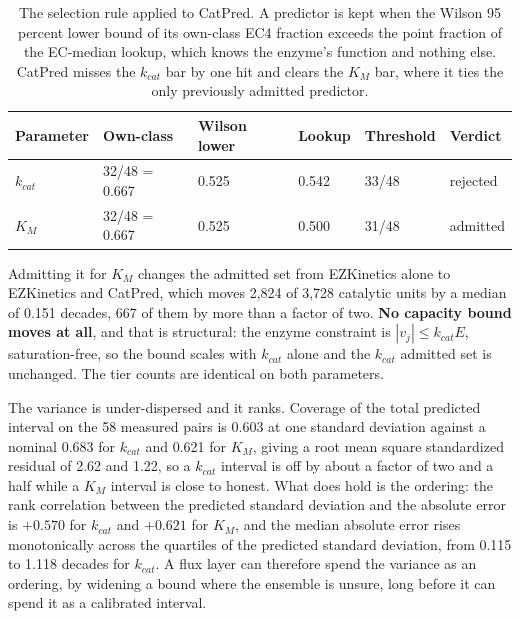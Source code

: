 \begin{table}[!htbp]
  \centering
  \footnotesize
  \caption[CatPred admission]{The selection rule applied to CatPred. A predictor is kept
  when the Wilson 95 percent lower bound of its own-class EC4 fraction exceeds the point
  fraction of the EC-median lookup, which knows the enzyme's function and nothing else.
  CatPred misses the $k_{cat}$ bar by one hit and clears the $K_M$ bar, where it ties the
  only previously admitted predictor.}
  \label{tab:catpred-admission}
  \begin{tabular}{llllll}
    \hline
    Parameter & Own-class & Wilson lower & Lookup & Threshold & Verdict \\
    \hline
    $k_{cat}$ & 32/48 = 0.667 & 0.525 & 0.542 & 33/48 & rejected \\
    $K_M$ & 32/48 = 0.667 & 0.525 & 0.500 & 31/48 & admitted \\
    \hline
  \end{tabular}
\end{table}

Admitting it for $K_M$ changes the admitted set from EZKinetics alone to EZKinetics and
CatPred, which moves 2{,}824 of 3{,}728 catalytic units by a median of 0.151 decades, 667 of
them by more than a factor of two. \textbf{No capacity bound moves at all}, and that is
structural: the enzyme constraint is $|v_j| \le k_{cat} E$, saturation-free, so the bound
scales with $k_{cat}$ alone and the $k_{cat}$ admitted set is unchanged. The tier counts are
identical on both parameters.

The variance is under-dispersed and it ranks. Coverage of the total predicted interval on
the 58 measured pairs is 0.603 at one standard deviation against a nominal 0.683 for
$k_{cat}$ and 0.621 for $K_M$, giving a root mean square standardized residual of 2.62 and
1.22, so a $k_{cat}$ interval is off by about a factor of two and a half while a $K_M$
interval is close to honest. What does hold is the ordering: the rank correlation between the
predicted standard deviation and the absolute error is $+0.570$ for $k_{cat}$ and $+0.621$
for $K_M$, and the median absolute error rises monotonically across the quartiles of the
predicted standard deviation, from 0.115 to 1.118 decades for $k_{cat}$. A flux layer can
therefore spend the variance as an ordering, by widening a bound where the ensemble is
unsure, long before it can spend it as a calibrated interval.
